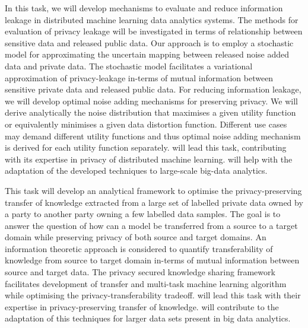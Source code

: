 \begin{Workpackage}{\thewpno}
\begin{Task}
  \TaskResults{%
  \ref{del:bigdata1}
   \ref{del:bigdata2}
   \ref{del:bigdata3}
  }
  \TaskHeader{}
  In this task, we will develop mechanisms to evaluate and reduce information leakage in distributed machine learning data analytics systems. The methods for evaluation of privacy leakage will be investigated in terms of relationship between sensitive data and released public data. Our approach is to employ a stochastic model for approximating the uncertain mapping between released noise added data and private data. The stochastic model facilitates a variational approximation of privacy-leakage in-terms of mutual information between sensitive private data and released public data. For reducing information leakage, we will develop optimal noise adding mechanisms for preserving privacy. We will derive analytically the noise distribution that maximises a given utility function or equivalently minimises a given data distortion function. Different use cases may demand different utility functions and thus optimal noise adding mechanism is derived for each utility function separately. \SCCHshort{} will lead this task, contributing with its expertise in privacy of distributed machine learning. \UODshort{} will help with the adaptation of the developed techniques to large-scale big-data analytics. 

 \end{Task}

 \begin{Task}

  \TaskResults{%
    \ref{del:bigdata1}
   \ref{del:bigdata2}
   \ref{del:bigdata3}
  }
  \TaskHeader{}
  This task will develop an analytical framework to optimise the privacy-preserving transfer of knowledge extracted from a large set of labelled private data owned by a party to another party owning a few labelled data samples. The goal is to answer the question of how can a model be transferred from a source to a target domain while preserving privacy of both source and target domains. An information theoretic approach is considered to quantify transferability of knowledge from source to target domain in-terms of mutual information between source and target data. The privacy secured knowledge sharing framework facilitates development of transfer and multi-task machine learning algorithm while optimising the privacy-transferability tradeoff. \SCCHshort{} will lead this task with their expertise in privacy-preserving transfer of knowledge. \UODshort{} will contribute to the adaptation of this techniques for larger data sets present in big data analytics. 
 \end{Task}


\end{Workpackage}
